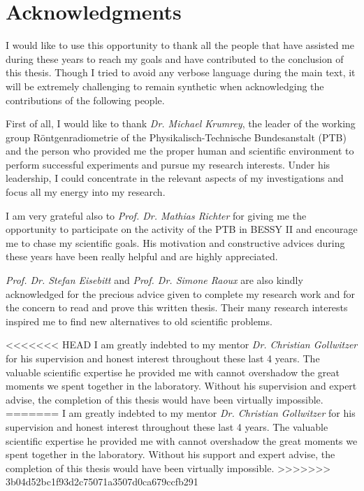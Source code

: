 \pagestyle{empty}
\noindent
\section*{Acknowledgments}

I would like to use this opportunity to thank all the people that have assisted me during these years to reach my goals and have contributed to the conclusion of this thesis. Though I tried to avoid any verbose language during the main text, it will be extremely challenging to remain synthetic when acknowledging the contributions of the following people.
\vspace{2ex}

\noindent First of all, I would like to thank \emph{Dr. Michael Krumrey}, the leader of the working group Röntgenradiometrie of the Physikalisch-Technische Bundesanstalt (PTB) and the person who provided me the proper human and scientific environment to perform successful experiments and pursue my research interests. Under his leadership, I could concentrate in the relevant aspects of my investigations and focus all my energy into my research.
\vspace{2ex}

\noindent I am very grateful also to \emph{Prof. Dr. Mathias Richter} for giving me the opportunity to participate on the activity of the PTB in BESSY II and encourage me to chase my scientific goals. His motivation and constructive advices during these years have been really helpful and are highly appreciated. 
\vspace{2ex}

\noindent \emph{Prof. Dr. Stefan Eisebitt} and \emph{Prof. Dr. Simone Raoux} are also kindly acknowledged for the precious advice given to complete my research work and for the concern to read and prove this written thesis. Their many research interests inspired me to find new alternatives to old scientific problems.
\vspace{2ex}

<<<<<<< HEAD
\noindent I am greatly indebted to my mentor \emph{Dr. Christian Gollwitzer} for his supervision and honest interest throughout these last 4 years. The valuable scientific expertise he provided me with cannot overshadow the great moments we spent together in the laboratory. Without his supervision and expert advise, the completion of this thesis would have been virtually impossible.
=======
\noindent I am greatly indebted to my mentor \emph{Dr. Christian Gollwitzer} for his supervision and honest interest throughout these last 4 years. The valuable scientific expertise he provided me with cannot overshadow the great moments we spent together in the laboratory. Without his support and expert advise, the completion of this thesis would have been virtually impossible.
>>>>>>> 3b04d52bc1f93d2c75071a3507d0ca679ccfb291
\vspace{2ex}

